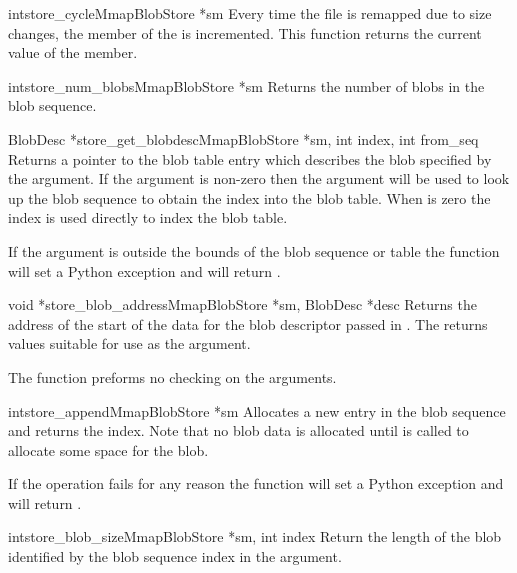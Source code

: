 \begin{cfuncdesc}{int}{store_cycle}{MmapBlobStore *sm}
Every time the file is remapped due to size changes, the 
member of the  is incremented.  This function
returns the current value of the  member.
\end{cfuncdesc}

\begin{cfuncdesc}{int}{store_num_blobs}{MmapBlobStore *sm}
Returns the number of blobs in the blob sequence.
\end{cfuncdesc}

\begin{cfuncdesc}{BlobDesc *}{store_get_blobdesc}{MmapBlobStore *sm, int index, int from_seq}
Returns a pointer to the blob table entry which describes the blob
specified by the  argument.  If the  argument
is non-zero then the  argument will be used to look up the
blob sequence to obtain the index into the blob table.  When
 is zero the index is used directly to index the blob
table.

If the  argument is outside the bounds of the blob sequence
or table the function will set a Python 
exception and will return \NULL{}.
\end{cfuncdesc}

\begin{cfuncdesc}{void *}{store_blob_address}{MmapBlobStore *sm, BlobDesc *desc}
Returns the address of the start of the data for the blob descriptor
passed in .  The  returns
values suitable for use as the  argument.

The function preforms no checking on the arguments.
\end{cfuncdesc}

\begin{cfuncdesc}{int}{store_append}{MmapBlobStore *sm}
Allocates a new entry in the blob sequence and returns the index.
Note that no blob data is allocated until
 is called to allocate some space for
the blob.

If the operation fails for any reason the function will set a Python
exception and will return .
\end{cfuncdesc}

\begin{cfuncdesc}{int}{store_blob_size}{MmapBlobStore *sm, int index}
Return the length of the blob identified by the blob sequence index in
the  argument.
\end{cfuncdesc}

